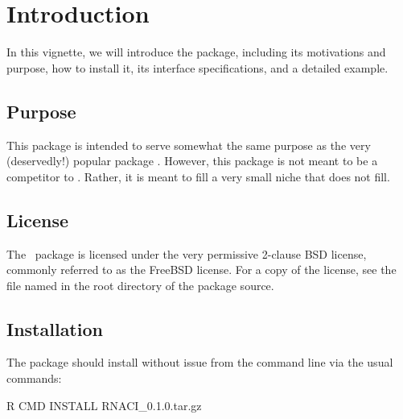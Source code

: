 \section{Introduction}

In this vignette, we will introduce the \thispackage package, including its 
motivations and purpose, how to install it, its interface specifications, and a 
detailed 
example.


\subsection{Purpose}
This package is intended to serve somewhat the same purpose as the very 
(deservedly!) popular package .  However, this package is not meant
to be a competitor to .  Rather, it is meant to fill a very small niche
that  does not fill.


\subsection{License}

The \thispackage\ package is licensed under the very permissive 2-clause BSD 
license, commonly referred to as the FreeBSD license.  For a copy of the license,
see the file named  in the root directory of the package source.


\subsection{Installation}

The package should install without issue from the command line via the usual 
commands:
\begin{Command}
R CMD INSTALL RNACI_0.1.0.tar.gz
\end{Command}
